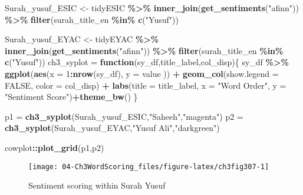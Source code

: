 \documentclass[
]{article}
\newenvironment{Shaded}{\begin{snugshade}}{\end{snugshade}}
\newcommand{\AttributeTok}[1]{\textcolor[rgb]{0.13,0.29,0.53}{#1}}
\newcommand{\ConstantTok}[1]{\textcolor[rgb]{0.56,0.35,0.01}{#1}}
\newcommand{\ControlFlowTok}[1]{\textcolor[rgb]{0.13,0.29,0.53}{\textbf{#1}}}
\newcommand{\DecValTok}[1]{\textcolor[rgb]{0.00,0.00,0.81}{#1}}
\newcommand{\FunctionTok}[1]{\textcolor[rgb]{0.13,0.29,0.53}{\textbf{#1}}}
\newcommand{\NormalTok}[1]{#1}
\newcommand{\OtherTok}[1]{\textcolor[rgb]{0.56,0.35,0.01}{#1}}
\newcommand{\SpecialCharTok}[1]{\textcolor[rgb]{0.81,0.36,0.00}{\textbf{#1}}}
\newcommand{\StringTok}[1]{\textcolor[rgb]{0.31,0.60,0.02}{#1}}
\begin{document}
\begin{Shaded}
\begin{Highlighting}[]
\NormalTok{Surah\_yusuf\_ESIC }\OtherTok{\textless{}{-}}\NormalTok{ tidyESIC }\SpecialCharTok{\%\textgreater{}\%}
  \FunctionTok{inner\_join}\NormalTok{(}\FunctionTok{get\_sentiments}\NormalTok{(}\StringTok{"afinn"}\NormalTok{)) }\SpecialCharTok{\%\textgreater{}\%}
  \FunctionTok{filter}\NormalTok{(surah\_title\_en }\SpecialCharTok{\%in\%} \FunctionTok{c}\NormalTok{(}\StringTok{"Yusuf"}\NormalTok{))}

\NormalTok{Surah\_yusuf\_EYAC }\OtherTok{\textless{}{-}}\NormalTok{ tidyEYAC }\SpecialCharTok{\%\textgreater{}\%}
  \FunctionTok{inner\_join}\NormalTok{(}\FunctionTok{get\_sentiments}\NormalTok{(}\StringTok{"afinn"}\NormalTok{)) }\SpecialCharTok{\%\textgreater{}\%}
  \FunctionTok{filter}\NormalTok{(surah\_title\_en }\SpecialCharTok{\%in\%} \FunctionTok{c}\NormalTok{(}\StringTok{"Yusuf"}\NormalTok{))}
\NormalTok{ch3\_syplot }\OtherTok{=} \ControlFlowTok{function}\NormalTok{(sy\_df,title\_label,col\_disp)\{}
\NormalTok{  sy\_df }\SpecialCharTok{\%\textgreater{}\%} 
        \FunctionTok{ggplot}\NormalTok{(}\FunctionTok{aes}\NormalTok{(}\AttributeTok{x =} \DecValTok{1}\SpecialCharTok{:}\FunctionTok{nrow}\NormalTok{(sy\_df), }\AttributeTok{y =}\NormalTok{ value )) }\SpecialCharTok{+}
          \FunctionTok{geom\_col}\NormalTok{(}\AttributeTok{show.legend =} \ConstantTok{FALSE}\NormalTok{, }\AttributeTok{color =}\NormalTok{ col\_disp) }\SpecialCharTok{+}
          \FunctionTok{labs}\NormalTok{(}\AttributeTok{title =}\NormalTok{ title\_label, }
               \AttributeTok{x =} \StringTok{"Word Order"}\NormalTok{,}
               \AttributeTok{y =} \StringTok{"Sentiment Score"}\NormalTok{)}\SpecialCharTok{+}\FunctionTok{theme\_bw}\NormalTok{()}
\NormalTok{\}}

\NormalTok{p1 }\OtherTok{=} \FunctionTok{ch3\_syplot}\NormalTok{(Surah\_yusuf\_ESIC,}\StringTok{"Saheeh"}\NormalTok{,}\StringTok{"magenta"}\NormalTok{)}
\NormalTok{p2 }\OtherTok{=} \FunctionTok{ch3\_syplot}\NormalTok{(Surah\_yusuf\_EYAC,}\StringTok{"Yusuf Ali"}\NormalTok{,}\StringTok{"darkgreen"}\NormalTok{)}

\NormalTok{cowplot}\SpecialCharTok{::}\FunctionTok{plot\_grid}\NormalTok{(p1,p2)}
\end{Highlighting}
\end{Shaded}

\begin{figure}

{\centering \texttt{[image: 04-Ch3WordScoring\_files/figure-latex/ch3fig307-1]} 

}

\caption{Sentiment scoring within Surah Yusuf}\label{fig:ch3fig307}
\end{figure}
\end{document}
